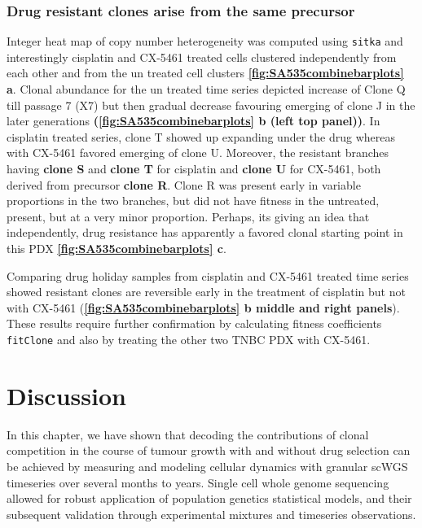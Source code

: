 \subsubsection{Drug resistant clones arise from the same precursor}
Integer heat map of copy number heterogeneity was computed using \texttt{sitka} and interestingly cisplatin and CX-5461 treated cells clustered independently from each other and from the un treated cell clusters \textbf{\autoref{fig:SA535combinebarplots} a}. Clonal abundance for the un treated time series depicted increase of Clone Q till passage 7 (X7) but then gradual decrease favouring emerging of clone J in the later generations \textbf{(\autoref{fig:SA535combinebarplots} b (left top panel))}. In cisplatin treated series, clone T showed up expanding under the drug whereas with CX-5461 favored emerging of clone U.
Moreover, the resistant branches having \textbf{clone S} and \textbf{clone T} for cisplatin and \textbf{clone U} for CX-5461, both derived from precursor \textbf{clone R}. Clone R was present early in variable proportions in the two branches, but did not have fitness in the untreated, present, but at a very minor proportion. Perhaps, its giving an idea that independently, drug resistance has apparently a favored clonal starting point in this PDX \textbf{\autoref{fig:SA535combinebarplots} c}. 

Comparing drug holiday samples from cisplatin and CX-5461 treated time series showed resistant clones are reversible early in the treatment of cisplatin but not with CX-5461 (\textbf{\autoref{fig:SA535combinebarplots} b middle and right panels}).
These results require further confirmation by calculating fitness coefficients \texttt{fitClone} and also by treating the other two TNBC PDX with CX-5461.



\section{Discussion}

In this chapter, we have shown that decoding the contributions of clonal competition in the course of tumour growth with and without drug selection can be achieved by measuring and modeling cellular dynamics with granular scWGS timeseries over several months to years.
Single cell whole genome sequencing allowed for robust application of population genetics statistical models, and their subsequent validation through experimental mixtures and timeseries observations.

